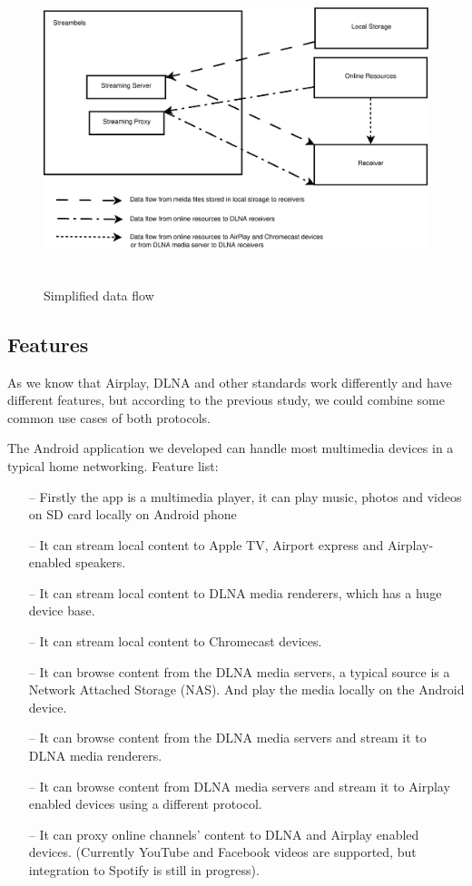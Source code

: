 \begin{figure}[htb]
\centering \includegraphics[height=9cm]{charts/data_flow}
\caption{Simplified data flow \label{chart4}}
\end{figure}



\subsection{Features}
As we know that Airplay, DLNA and other standards work differently and have
different features, but according to the previous study, we could combine some
common use cases of both protocols.

The Android application we developed can handle most multimedia devices in 
a typical home networking. Feature list:
\begin{itemize}
\item[--]Firstly the app is a multimedia player, it can play music, photos and videos 
on SD card locally on Android phone
\item[--]It can stream local content to Apple TV, Airport express and Airplay-enabled 
speakers.
\item[--]It can stream local content to DLNA media renderers, which has a huge device 
base.
\item[--]It can stream local content to Chromecast devices.
\item[--]It can browse content from the DLNA media servers, a typical source is a 
Network Attached Storage (NAS). And play the media locally on the Android device.
\item[--]It can browse content from the DLNA media servers and stream it to DLNA media 
renderers.
\item[--]It can browse content from DLNA media servers and stream it to Airplay enabled 
devices using a different protocol.
\item[--]It can proxy online channels' content to DLNA and Airplay enabled devices. 
(Currently YouTube and Facebook videos are supported, but integration to Spotify is still 
in progress).
\end{itemize}

